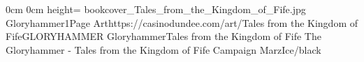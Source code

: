 \documentclass[letterpaper,openany,twoside,twocolumn]{book}
\begin{document}
	\DungeonSheetGeometry

		{0cm}%
		{0cm}%
		{height=\paperheight}%
		{bookcover_Tales_from_the_Kingdom_of_Fife.jpg}%
		{%
			{Gloryhammer1}{Page \thepage}{Art}{https://casinodundee.com/art/}{Tales from the Kingdom of Fife}{GLORYHAMMER}%
		}%
		{{\darkcrystalfont}{Gloryhammer}{\digitalfont}{Tales from the Kingdom of Fife}}%
		{{\digitalfont}{The Gloryhammer - Tales from the Kingdom of Fife Campaign}}%
		{MarzIce/black}%
	
	\clearpage
	\tableofcontents
	
	\DndSetThemeColor[PhbTan]
	
	
	
	
	
	
	
	
	
	
	
	
	
	
	
	
	
	
\end{document}
